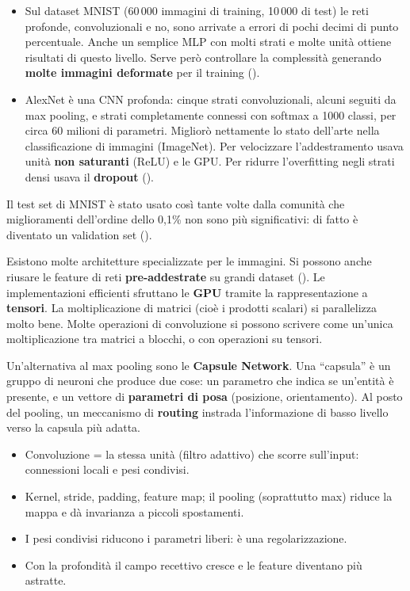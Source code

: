 \begin{itemize}
  \item Sul dataset MNIST (60\,000 immagini di training, 10\,000 di test) le reti profonde, convoluzionali e no,
        sono arrivate a errori di pochi decimi di punto percentuale. Anche un semplice MLP con molti strati e molte
        unità ottiene risultati di questo livello. Serve però controllare la complessità generando \textbf{molte
        immagini deformate} per il training ().
  \item AlexNet è una CNN profonda: cinque strati convoluzionali, alcuni seguiti da max pooling, e strati
        completamente connessi con softmax a 1000 classi, per circa 60 milioni di parametri. Migliorò nettamente lo
        stato dell'arte nella classificazione di immagini (ImageNet). Per velocizzare l'addestramento usava unità
        \textbf{non saturanti} (ReLU) e le GPU. Per ridurre l'overfitting negli strati densi usava il
        \textbf{dropout} ().
\end{itemize}

\begin{attenzione}
Il test set di MNIST è stato usato così tante volte dalla comunità che miglioramenti dell'ordine dello 0,1\% non sono
più significativi: di fatto è diventato un validation set ().
\end{attenzione}

Esistono molte architetture specializzate per le immagini. Si possono anche riusare le feature di reti
\textbf{pre-addestrate} su grandi dataset (). Le implementazioni efficienti sfruttano le
\textbf{GPU} tramite la rappresentazione a \textbf{tensori}. La moltiplicazione di matrici (cioè i prodotti
scalari) si parallelizza molto bene. Molte operazioni di convoluzione si possono scrivere come un'unica
moltiplicazione tra matrici a blocchi, o con operazioni su tensori.

Un'alternativa al max pooling sono le \textbf{Capsule Network}. Una ``capsula'' è un gruppo di neuroni che produce
due cose: un parametro che indica se un'entità è presente, e un vettore di \textbf{parametri di posa} (posizione,
orientamento). Al posto del pooling, un meccanismo di \textbf{routing} instrada l'informazione di basso livello
verso la capsula più adatta.

\begin{puntichiave}
\begin{itemize}
  \item Convoluzione = la stessa unità (filtro adattivo) che scorre sull'input: connessioni locali e pesi condivisi.
  \item Kernel, stride, padding, feature map; il pooling (soprattutto max) riduce la mappa e dà invarianza a piccoli
        spostamenti.
  \item I pesi condivisi riducono i parametri liberi: è una regolarizzazione.
  \item Con la profondità il campo recettivo cresce e le feature diventano più astratte.
\end{itemize}
\end{puntichiave}


